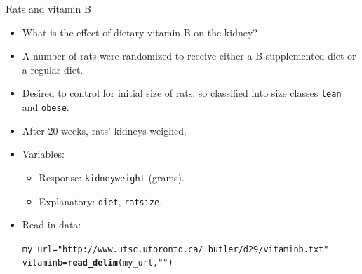 \documentclass[unknownkeysallowed]{beamer}\usepackage[]{graphicx}\usepackage[]{color}
\makeatletter
\newcommand{\hlstr}[1]{\textcolor[rgb]{0.192,0.494,0.8}{#1}}%
\newcommand{\hlstd}[1]{\textcolor[rgb]{0.345,0.345,0.345}{#1}}%
\newcommand{\hlkwb}[1]{\textcolor[rgb]{0.69,0.353,0.396}{#1}}%
\newcommand{\hlkwd}[1]{\textcolor[rgb]{0.737,0.353,0.396}{\textbf{#1}}}%
\newenvironment{kframe}{%
 \def\at@end@of@kframe{}%
 \ifinner\ifhmode%
  \def\at@end@of@kframe{\end{minipage}}%
  \begin{minipage}{\columnwidth}%
 \fi\fi%
 \def\FrameCommand##1{\hskip\@totalleftmargin \hskip-\fboxsep
 \colorbox{shadecolor}{##1}\hskip-\fboxsep
     \hskip-\linewidth \hskip-\@totalleftmargin \hskip\columnwidth}%
 \MakeFramed {\advance\hsize-\width
   \@totalleftmargin\z@ \linewidth\hsize
   \@setminipage}}%
 {\par\unskip\endMakeFramed%
 \at@end@of@kframe}
\newenvironment{knitrout}{}{} %
\makeatother
\begin{document}
\begin{frame}[fragile]{Rats and vitamin B}
  
  \begin{itemize}
  \item What is the effect of dietary vitamin B on the kidney?
  \item A number of rats were randomized to receive either a
    B-supplemented diet or a regular diet.
  \item Desired to control for initial size of rats, so classified
    into size classes \texttt{lean} and \texttt{obese}.
  \item After 20 weeks, rats' kidneys weighed.
  \item Variables:
    \begin{itemize}
    \item Response: \texttt{kidneyweight} (grams).
    \item Explanatory: \texttt{diet}, \texttt{ratsize}.
    \end{itemize}
  \item Read in data:
    
\begin{knitrout}
\color{fgcolor}\begin{kframe}
\begin{alltt}
\hlstd{my_url}\hlkwb{=}\hlstr{"http://www.utsc.utoronto.ca/~butler/d29/vitaminb.txt"}
\hlstd{vitaminb}\hlkwb{=}\hlkwd{read_delim}\hlstd{(my_url,}\hlstr{" "}\hlstd{)}
\end{alltt}


{\ttfamily\noindent\itshape\color{messagecolor}{\#\# Parsed with column specification:\\\#\# cols(\\\#\#\ \  ratsize = col\_character(),\\\#\#\ \  diet = col\_character(),\\\#\#\ \  kidneyweight = col\_double()\\\#\# )}}\end{kframe}
\end{knitrout}
  \end{itemize}
  
\end{frame}
\end{document}
